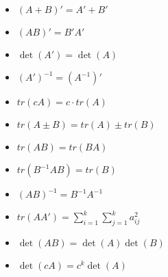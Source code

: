 \documentclass[twoside]{article}
\begin{document}
\begin{itemize}
	\item $(A+B)'=A'+B'$
	\item $(AB)'=B'A'$
	\item $\det(A')=\det(A)$
	\item $(A')^{-1}=(A^{-1})'$
	\item $tr(cA)=c\cdot tr(A)$
	\item $tr(A\pm B)=tr(A)\pm tr(B)$
	\item $tr(AB)=tr(BA)$
	\item $tr(B^{-1}AB)=tr(B)$
	\item $(AB)^{-1}=B^{-1}A^{-1}$
	\item $tr(AA')=\sum^k_{i=1}\sum^k_{j=1}a_{ij}^2$
	\item $\det(AB)=\det(A)\det(B)$
	\item $\det(cA)=c^k\det(A)$
\end{itemize}

\end{document}
